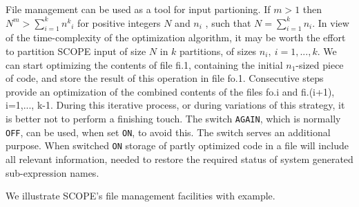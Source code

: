 File management can be used as a tool for input partioning.  If $m>1$ then
$N^m>\sum_{i=1}^k {n^k}_i$ for positive integers $N$ and $n_i$ , such that
$N=\sum_{i=1}^k n_i$. In view of the time-complexity of the
optimization algorithm, it may be worth the effort to partition
SCOPE input of size $N$ in $k$ partitions, of sizes $n_i,~i=1,...,k$. We can
start optimizing the contents of file fi.1, containing the initial $n_1$-sized
piece of code, and store the result of this operation in file fo.1. 
Consecutive steps provide an optimization of the combined contents of the 
files fo.i and fi.(i+1), i=1,..., k-1. 
During this iterative process, or during variations 
of this strategy, it is better not to perform a finishing touch. The switch
{\tt AGAIN}, which is normally {\tt OFF}, can be used, when set {\tt ON}, to 
avoid this. The switch serves an additional purpose. When switched {\tt ON} 
storage of partly optimized code in a file will include all relevant 
information, needed to restore the required status of system generated 
sub-expression names.

We illustrate SCOPE's file management facilities with example.

\example\label{ex:5.1}

